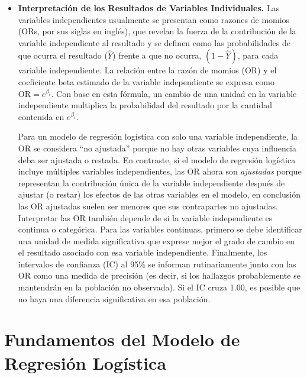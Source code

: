 \documentclass[12pt]{article}
\begin{document}
\begin{itemize}
\item \textbf{Interpretaci\'on de los Resultados de Variables Individuales.}  Las variables independientes usualmente se presentan como razones de momios (ORs, por sus siglas en ingl\'es), que revelan la fuerza de la contribuci\'on de la variable independiente al resultado y se definen como las probabilidades de que ocurra el resultado ($\hat{Y}$) frente a que no ocurra, $(1 - \hat{Y})$, para cada variable independiente. La relaci\'on entre la raz\'on de momios (OR) y el coeficiente beta estimado de la variable independiente se expresa como $\text{OR} = e^{\beta_i}$. Con base en esta f\'ormula, un cambio de una unidad en la variable independiente multiplica la probabilidad del resultado por la cantidad contenida en $e^{\beta_i}$.

Para un modelo de regresi\'on log\'istica con solo una variable independiente, la OR se considera ``no ajustada'' porque no hay otras variables cuya influencia deba ser ajustada o restada. En contraste, si el modelo de regresi\'on log\'istica incluye m\'ultiples variables independientes, las OR ahora son \textit{ajustadas} porque representan la contribuci\'on \'unica de la variable independiente despu\'es de ajustar (o restar) los efectos de las otras variables en el modelo, en conclusi\'on las OR ajustadas suelen ser menores que sus contrapartes no ajustadas. Interpretar las OR tambi\'en depende de si la variable independiente es continua o categ\'orica. Para las variables continuas, primero se debe identificar una unidad de medida significativa que exprese mejor el grado de cambio en el resultado asociado con esa variable independiente. Finalmente, los intervalos de confianza (IC) al 95\% se informan rutinariamente junto con las OR como una medida de precisi\'on (es decir, si los hallazgos probablemente se mantendr\'an en la poblaci\'on no observada). Si el IC cruza 1.00, es posible que no haya una diferencia significativa en esa poblaci\'on. 
\end{itemize}


\section{Fundamentos del Modelo de Regresi\'on Log\'istica}
\end{document}
